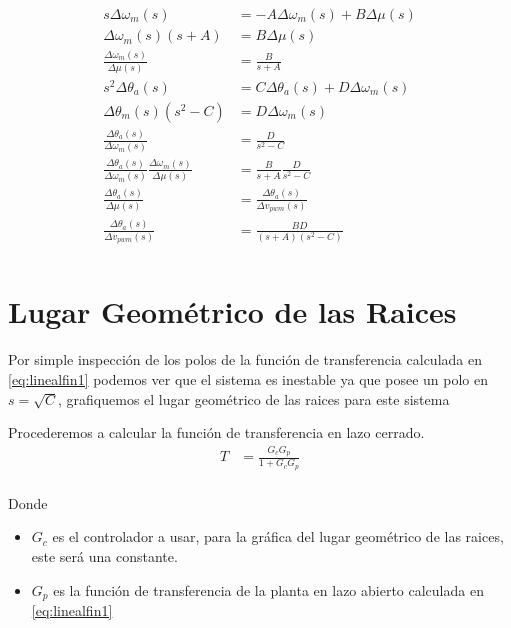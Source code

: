 \documentclass[a4paper]{IEEEtran} %
\begin{document}
\begin{equation}
    \begin{split}
        s\Delta\omega_{m}(s)&=-A\Delta\omega_{m}(s)+B\Delta\mu(s)\\
        \Delta\omega_{m}(s)(s+A)&=B\Delta\mu(s)\\
        \frac{\Delta\omega_{m}(s)}{\Delta\mu(s)}&=\frac{B}{s+A}\\
        s^2\Delta\theta_{a}(s)&=C\Delta\theta_{a}(s)+D\Delta\omega_{m}(s)\\
        \Delta\theta_{m}(s)(s^2-C)&=D\Delta\omega_{m}(s)\\
        \frac{\Delta\theta_{a}(s)}{\Delta\omega_{m}(s)}&=\frac{D}{s^2-C}\\
        \frac{\Delta\theta_{a}(s)}{\Delta\omega_{m}(s)}\frac{\Delta\omega_{m}(s)}{\Delta\mu(s)}&=\frac{B}{s+A}\frac{D}{s^2-C}\\
        \frac{\Delta\theta_{a}(s)}{\Delta\mu(s)}&=\frac{\Delta\theta_{a}(s)}{\Delta v_{pwm}(s)}\\
        \frac{\Delta\theta_{a}(s)}{\Delta v_{pwm}(s)}&=\frac{BD}{(s+A)(s^2-C)}\\
    \end{split}
    \label{eq:linealfin1}
\end{equation}
\section{Lugar Geométrico de las Raices}
Por simple inspección de los polos de la función de transferencia calculada en \ref{eq:linealfin1} podemos ver que el sistema es inestable ya que posee un polo en $s=\sqrt{C}$, grafiquemos el lugar geométrico de las raices para este sistema

Procederemos a calcular la función de transferencia en lazo cerrado.
\begin{equation}
    \begin{split}
        T&=\frac{G_{c}G_{p}}{1+G_{c}G_{p}}\\
    \end{split}
    \label{eq:locus}
\end{equation}

Donde 
\begin{itemize}
    \item $G_{c}$ es el controlador a usar, para la gráfica del lugar geométrico de las raices, este será una constante.
    \item $G_{p}$ es la función de transferencia de la planta en lazo abierto calculada en \ref{eq:linealfin1}
\end{itemize}
\end{document}
